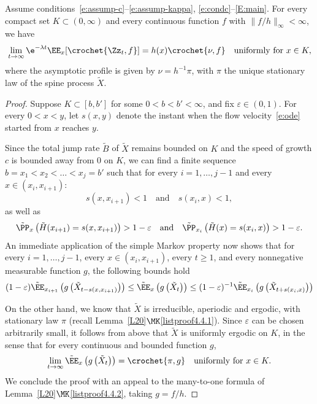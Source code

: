 \begin{coro}\label{C1}
Assume conditions~\eqref{e:assump-c}--\eqref{e:assump-kappa}, \eqref{e:condc}--\eqref{E:main}. For every compact set $K\subset (0,\infty)$ and every continuous function $f$ with $\|f/h\|_{\infty}<\infty$, we have
\[
\lim_{t\to \infty} \e^{-\lambda t}\EE_x[\crochet{ \Zz_t,f}]= h(x) \crochet{\nu,f} \quad \text{uniformly for }x\in K,
\]
where the asymptotic profile is given by $\nu=h^{-1}\pi$, with $\pi$ the unique stationary law of the spine process $\tilde X$.
\end{coro}

\begin{proof}
Suppose $K\subset [b,b']$ for some $0<b<b'<\infty$, and fix $ \varepsilon \in (0,1)$.
For every $0<x<y$, let $s(x,y)$ denote the instant when the flow velocity~\eqref{e:ode} started from $x$ reaches $y$.

Since the total jump rate $\tilde B$ of $\tilde X$ remains bounded on $K$ and the speed of growth $c$ is bounded away from $0$ on $K$, we can find a finite sequence $b=x_1< x_2 < \ldots < x_j=b'$ such that for every $i=1, \ldots, j-1$ and every $x\in(x_i, x_{i+1})$:
\[
s(x,x_{i+1})<1 \quad \text{and}\quad s(x_i,x) < 1,
\]
as well as
\[
\tilde \PP_{x}\left(\tilde H(x_{i+1})=s(x,x_{i+1})\right) >1-\varepsilon \quad \text{and}\quad \tilde \PP_{x_i}\left(\tilde H(x)=s(x_i,x)\right) >1-\varepsilon.
\]
An immediate application of the simple Markov property now shows that for every $i=1, \ldots, j-1$, every $x\in(x_i, x_{i+1})$, every $t\geq 1$, and every nonnegative measurable function $g$, the following bounds hold
\[
(1-\varepsilon) \tilde \EE_{x_{i+1}}\left(g\left(\tilde X_{t-s(x,x_{i+1})}\right)\right)
\le
\tilde \EE_{x}\left(g\left(\tilde X_{t}\right)\right)
\le (1-\varepsilon)^{-1} \tilde \EE_{x_i}\left(g\left(\tilde X_{t+s(x_i,x)}\right)\right)
\]

On the other hand, we know that $\tilde X$ is irreducible, aperiodic and ergodic, with stationary law $\pi$ (recall Lemma~\ref{L20}$\MK$\eqref{listproof4.4.1}). Since $\varepsilon$ can be chosen arbitrarily small, it follows from above that $\tilde X$ is uniformly ergodic on $K$, in the sense that for every continuous and bounded function $g$,
\[
\lim_{t\to \infty} \tilde \EE_{x}\left(g\left(\tilde X_{t}\right)\right)= \crochet{\pi, g} \quad \text{uniformly for }x\in K.
\]
We conclude the proof with an appeal to the many-to-one formula of Lemma~\ref{L20}$\MK$\eqref{listproof4.4.2}, taking $g=f/h$.
\end{proof}



